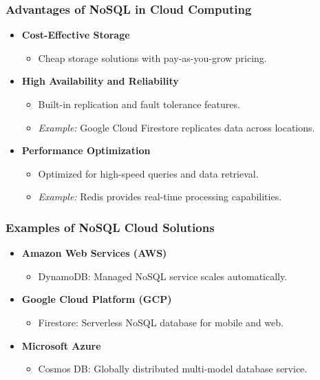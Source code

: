 \documentclass[aspectratio=169]{beamer}
\begin{document}
\begin{frame}[fragile]
    \frametitle{Advantages of NoSQL in Cloud Computing}
    \begin{itemize}
        \item \textbf{Cost-Effective Storage}
            \begin{itemize}
                \item Cheap storage solutions with pay-as-you-grow pricing.
            \end{itemize}
        
        \item \textbf{High Availability and Reliability}
            \begin{itemize}
                \item Built-in replication and fault tolerance features.
                \item \textit{Example:} Google Cloud Firestore replicates data across locations.
            \end{itemize}
        
        \item \textbf{Performance Optimization}
            \begin{itemize}
                \item Optimized for high-speed queries and data retrieval.
                \item \textit{Example:} Redis provides real-time processing capabilities.
            \end{itemize}
    \end{itemize}
\end{frame}

\begin{frame}[fragile]
    \frametitle{Examples of NoSQL Cloud Solutions}
    \begin{itemize}
        \item \textbf{Amazon Web Services (AWS)}
            \begin{itemize}
                \item DynamoDB: Managed NoSQL service scales automatically.
            \end{itemize}
        
        \item \textbf{Google Cloud Platform (GCP)}
            \begin{itemize}
                \item Firestore: Serverless NoSQL database for mobile and web.
            \end{itemize}
        
        \item \textbf{Microsoft Azure}
            \begin{itemize}
                \item Cosmos DB: Globally distributed multi-model database service.
            \end{itemize}
    \end{itemize}
\end{frame}
\end{document}
